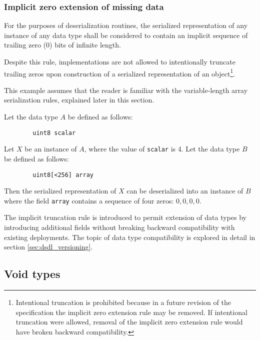 \subsubsection{Implicit zero extension of missing data}

For the purposes of deserialization routines,
the serialized representation of any instance of any data type shall be considered to contain an implicit
sequence of trailing zero (0) bits of infinite length.

Despite this rule, implementations are not allowed to intentionally truncate trailing zeros
upon construction of a serialized representation of an object\footnote{%
    Intentional truncation is prohibited because in a future revision of the specification the implicit zero
    extension rule may be removed.
    If intentional truncation were allowed, removal of the implicit zero extension rule would have
    broken backward compatibility.
}.

\begin{remark}
    This example assumes that the reader is familiar with the variable-length array serialization rules,
    explained later in this section.

    Let the data type $A$ be defined as follows:

    \begin{verbatim}
        uint8 scalar
    \end{verbatim}

    Let $X$ be an instance of $A$, where the value of \verb|scalar| is 4.
    Let the data type $B$ be defined as follows:

    \begin{verbatim}
        uint8[<256] array
    \end{verbatim}

    Then the serialized representation of $X$ can be deserialized into an instance of $B$ where the field
    \verb|array| contains a sequence of four zeros: $0, 0, 0, 0$.

    The implicit truncation rule is introduced to permit extension of data types by introducing additional fields
    without breaking backward compatibility with existing deployments.
    The topic of data type compatibility is explored in detail in section \ref{sec:dsdl_versioning}.
\end{remark}

\subsection{Void types}\label{sec:dsdl_serialized_void}

